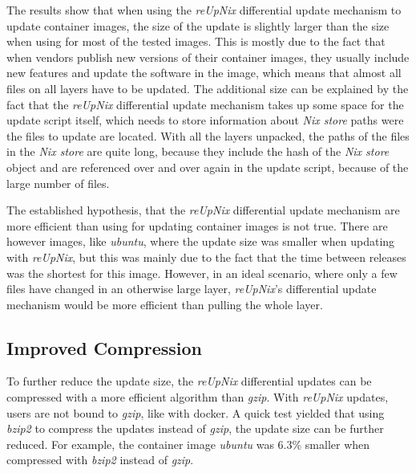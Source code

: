 \noindent
The results show that when using the \textit{reUpNix} differential update mechanism
to update container images, the size of the update is slightly larger than the size
when using  for most of the tested images. This is mostly due
to the fact that when vendors
publish new versions of their container images, they usually include new features
and update the software in the image, which means that almost all files on all
layers have to be updated. The additional size can be explained by the fact that the
\textit{reUpNix}
differential update mechanism takes up some space for the update script itself,
which needs to store information about \textit{Nix store} paths were the files
to update are located. With all the layers unpacked, the paths of the files
in the \textit{Nix store} are quite long, because they include the hash of the
\textit{Nix store} object and are referenced over and over again in the update script,
because of the large number of files.

The established hypothesis, that the \textit{reUpNix} differential update mechanism
are more efficient than using  for updating container images
is not true. There are however images, like \textit{ubuntu}, where the update size
was smaller when updating with \textit{reUpNix}, but this was mainly due to the
fact that the time between releases was the shortest for this image. However,
in an ideal scenario, where only a few files have changed in an otherwise large layer,
\textit{reUpNix}'s differential update mechanism would be more efficient than
pulling the whole layer.

\subsection{Improved Compression}
To further reduce the update size, the \textit{reUpNix} differential updates can
be compressed with a more efficient algorithm than \textit{gzip}. With \textit{reUpNix}
updates, users are not bound to \textit{gzip}, like with docker. A quick test
yielded that using \textit{bzip2} to compress the updates instead of \textit{gzip},
the update size can be further reduced. For example, the container image \textit{ubuntu}
was 6.3\% smaller when compressed with \textit{bzip2} instead of \textit{gzip}.

